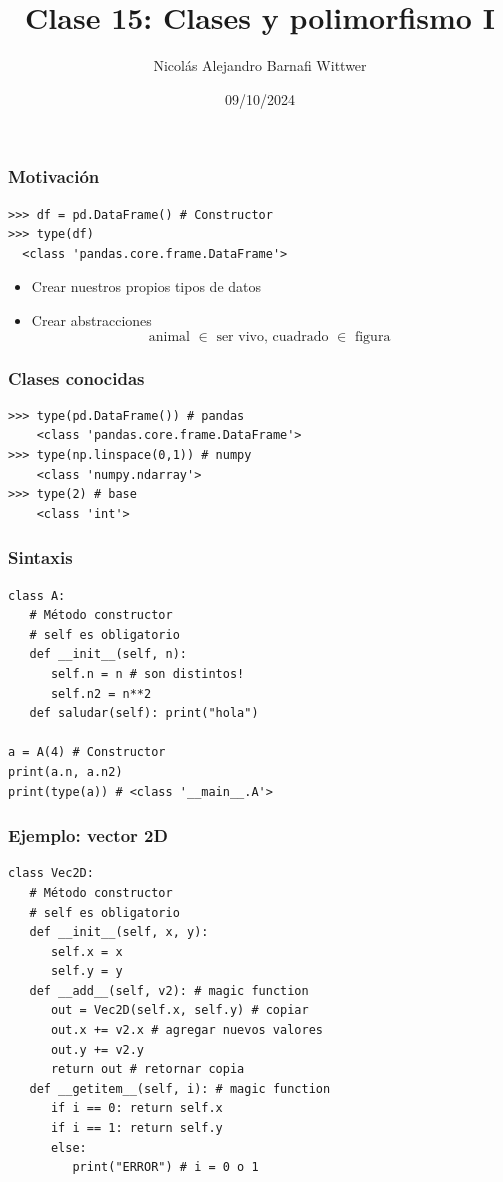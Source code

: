 \documentclass[14pt,aspectratio=169,xcolor=dvipsnames]{beamer}
\title[short title]{Clase 15: Clases y polimorfismo I}
\subtitle{}
\author[NA Barnafi] {Nicolás Alejandro Barnafi Wittwer}
\institute[UC|CMM] 
{
    Pontificia Universidad Católica de Chile \\
    Centro de Modelamiento Matemático
}
\date{09/10/2024}
\begin{document}
\begin{frame}
    \maketitle
\end{frame}
\begin{frame}[fragile]\frametitle{Motivación}
    \begin{verbatim}
>>> df = pd.DataFrame() # Constructor
>>> type(df)
  <class 'pandas.core.frame.DataFrame'>
    \end{verbatim}
    \begin{itemize}
        \item Crear nuestros propios tipos de datos
        \item Crear abstracciones 
    \[ \text{animal $\in$ ser vivo, cuadrado $\in$ figura }\]
    \end{itemize}
\end{frame}
\begin{frame}[fragile]\frametitle{Clases conocidas}
    \begin{verbatim}
>>> type(pd.DataFrame()) # pandas
    <class 'pandas.core.frame.DataFrame'>
>>> type(np.linspace(0,1)) # numpy
    <class 'numpy.ndarray'>
>>> type(2) # base
    <class 'int'>
    \end{verbatim}
\end{frame}
\begin{frame}[fragile]\frametitle{Sintaxis}
    \begin{verbatim}
class A:
   # Método constructor
   # self es obligatorio
   def __init__(self, n):
      self.n = n # son distintos!
      self.n2 = n**2
   def saludar(self): print("hola")

a = A(4) # Constructor
print(a.n, a.n2)
print(type(a)) # <class '__main__.A'>
    \end{verbatim}

\end{frame}
\begin{frame}[fragile]\frametitle{Ejemplo: vector 2D}
    \begin{footnotesize}
    \begin{verbatim}
class Vec2D:
   # Método constructor
   # self es obligatorio
   def __init__(self, x, y):
      self.x = x 
      self.y = y
   def __add__(self, v2): # magic function
      out = Vec2D(self.x, self.y) # copiar
      out.x += v2.x # agregar nuevos valores
      out.y += v2.y
      return out # retornar copia
   def __getitem__(self, i): # magic function
      if i == 0: return self.x
      if i == 1: return self.y
      else:
         print("ERROR") # i = 0 o 1
    \end{verbatim}
    \end{footnotesize}
\end{frame}
\end{document}

